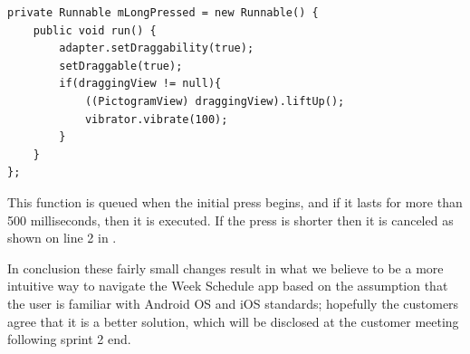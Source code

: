 \begin{lstlisting}[float, floatplacement=h, caption={The longpress function which is queued upon a \texttt{MotionEvent\_Down}, i.e. a touch.}, label={lst:longpress}]
private Runnable mLongPressed = new Runnable() {
    public void run() {
        adapter.setDraggability(true);
        setDraggable(true);
        if(draggingView != null){
            ((PictogramView) draggingView).liftUp();
            vibrator.vibrate(100);
        }
    }
};
\end{lstlisting}

This function is queued when the initial press begins, and if it lasts for more than 500 milliseconds, then it is executed.
If the press is shorter then it is canceled as shown on line 2 in .

\bigskip
In conclusion these fairly small changes result in what we believe to be a more intuitive way to navigate the Week Schedule app based on the assumption that the user is familiar with Android OS and iOS standards; hopefully the customers agree that it is a better solution, which will be disclosed at the customer meeting following sprint 2 end.
